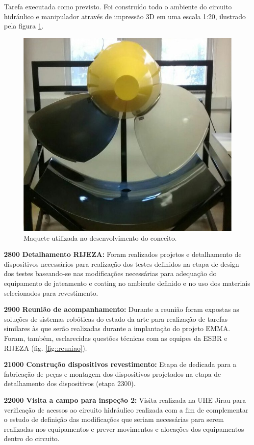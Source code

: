 Tarefa executada como previsto. Foi construído todo o ambiente do circuito
hidráulico e manipulador através de impressão 3D em uma escala 1:20, ilustrado
pela figura \ref{fig::maquete}.

\begin{figure}[h!]
\centering
\includegraphics[width=0.6\columnwidth]{figs/maquete}
\caption{Maquete utilizada no desenvolvimento do conceito.}
\label{fig::maquete}
\end{figure} 

  
\noindent
\textbf{2800 Detalhamento RIJEZA:} Foram realizados projetos e detalhamento de
dispositivos necessários para realização dos testes definidos na etapa de
design dos testes baseando-se nas modificações necessárias para adequação do
equipamento de jateamento e coating no ambiente definido e no uso dos materiais
selecionados para revestimento.

\noindent
\textbf{2900 Reunião de acompanhamento:} Durante a reunião foram expostas as
soluções de sistemas robóticas do estado da arte para realização de tarefas
similares às que serão realizadas durante a implantação	do projeto EMMA. Foram,
também, esclarecidas questões técnicas com as equipes da ESBR e RIJEZA (fig.
\ref{fig::reuniao}).

\noindent
\textbf{21000 Construção dispositivos revestimento:} Etapa de dedicada para a
fabricação de peças e montagem dos dispositivos projetados na etapa de
detalhamento dos dispositivos (etapa 2300).


\noindent
\textbf{22000 Visita a campo para inspeção 2:} Visita realizada na UHE Jirau
para verificação de acessos ao circuito hidráulico realizada com a fim de
complementar o estudo de definição das modificações que seriam necessárias para
serem realizadas nos equipamentos e prever movimentos e alocações dos
equipamentos dentro do circuito.


